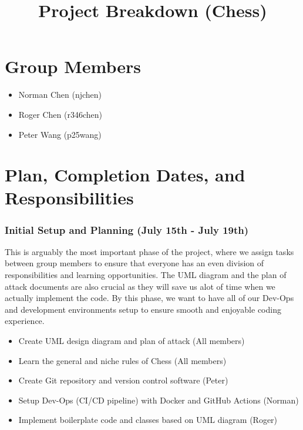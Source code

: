 \documentclass{article}
\title{Project Breakdown (Chess)}
\begin{document}
\maketitle
\section*{Group Members}
\begin{itemize}
    \item Norman Chen (njchen)
    \item Roger Chen (r346chen)
    \item Peter Wang (p25wang)
\end{itemize}
\section*{Plan, Completion Dates, and Responsibilities}
\subsubsection*{Initial Setup and Planning (July 15th - July 19th)}
This is arguably the most important phase of the project, where we assign tasks between group members to ensure that everyone has 
an even division of responsibilities and learning opportunities. The UML diagram and the plan of attack documents are also crucial as 
they will save us alot of time when we actually implement the code. By this phase, we want to have all of our Dev-Ops and
development environments setup to ensure smooth and enjoyable coding experience.
\begin{itemize}
    \item Create UML design diagram and plan of attack (All members)
    \item Learn the general and niche rules of Chess (All members)
    \item Create Git repository and version control software (Peter)
    \item Setup Dev-Ops (CI/CD pipeline) with Docker and GitHub Actions (Norman)
    \item Implement boilerplate code and classes based on UML diagram (Roger)
\end{itemize}
\end{document}
